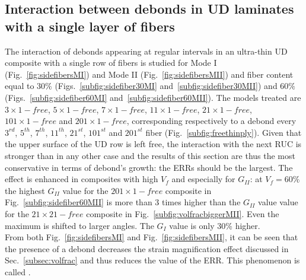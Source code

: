 \documentclass[review]{elsarticle}
\begin{document}
\subsection{Interaction between debonds in UD laminates with a single layer of fibers}\label{subsec:singlefiberud}

The interaction of debonds appearing at regular intervals in an ultra-thin UD composite with a single row of fibers is studied for Mode I (Fig.~\ref{fig:sidefibersMI}) and Mode II (Fig.~\ref{fig:sidefibersMII}) and fiber content equal to $30\%$ (Figs.~\ref{subfig:sidefiber30MI} and~\ref{subfig:sidefiber30MII}) and $60\%$ (Figs.~\ref{subfig:sidefiber60MI} and~\ref{subfig:sidefiber60MII}). The models treated are $3\times 1-free$, $5\times 1-free$, $7\times 1-free$, $11\times 1-free$, $21\times 1-free$, $101\times 1-free$ and $201\times 1-free$, corresponding respectively to a debond every $3^{rd}$, $5^{th}$, $7^{th}$, $11^{th}$, $21^{st}$, $101^{st}$ and $201^{st}$ fiber (Fig.~\ref{subfig:freethinply}). Given that the upper surface of the UD row is left free, the interaction with the next RUC is stronger than in any other case and the results of this section are thus the most conservative in terms of debond's growth: the ERRs should be the largest. The effect is enhanced in composites with high $V_{f}$ and especially for $G_{II}$: at $V_{f}=60\%$ the highest $G_{II}$ value for the $201\times 1-free$ composite in Fig.~\ref{subfig:sidefiber60MII} is more than $3$ times higher than the $G_{II}$ value value for the $21\times21-free$ composite in Fig.~\ref{subfig:volfracbiggerMII}. Even the maximum is shifted to larger angles. The $G_{I}$ value is only 30\% higher.\\
From both Fig.~\ref{fig:sidefibersMI} and Fig.~\ref{fig:sidefibersMII}, it can be seen that the presence of a debond decreases the strain magnification effect discussed in Sec.~\ref{subsec:volfrac} and thus reduces the value of the ERR. This phenomenon is called .
\end{document}
